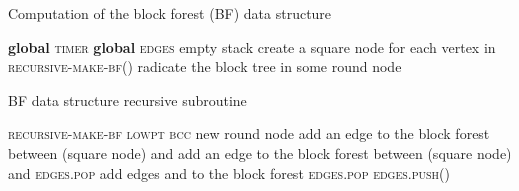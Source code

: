 \documentclass{llncs}
\begin{document}
		\begin{algorithm}[H]
		  \small
		  \caption{\small Computation of the block forest (BF) data structure}
		  \label{algo:block forest}
		  \begin{algorithmic}[1]
		    \State \textbf{global} \textsc{timer} 
		    \State \textbf{global} \textsc{edges}  empty stack
		    \State create a square node for each vertex in 
		    \For{}
		    		\State \textsc{recursive-make-bf}()
		    		\State radicate the block tree in some round node
		    	\EndIf
		    \EndFor
		    \EndProcedure
		  \end{algorithmic}
		\end{algorithm}

\vfill 
		\begin{algorithm}[H]
		  \small
		  \caption{\small BF data structure recursive subroutine}
		  \label{algo:recursive block forest}
		  \begin{algorithmic}[1]
		    \State 
		    \State 
		   	\State 
		    		\State 
		    		\State \textsc{recursive-make-bf}
		    		\State \textsc{lowpt}
		    		\If{}
		    			\State \textsc{bcc}  new round node
		    				\State add an edge to the block forest between  (square node) and 
		    				\State add an edge to the block forest between  (square node) and 
		    				\State \textsc{edges.pop}
		    			\EndWhile
		    			\State add edges  and  to the block forest
		    			\State \textsc{edges.pop}
		    		\EndIf
		    	\ElsIf{}
		    		 \State \textsc{edges.push}()
		    		 \State 
		    	\EndIf
		    \EndFor
		    \EndProcedure
		  \end{algorithmic}
		\end{algorithm}
\end{document}
